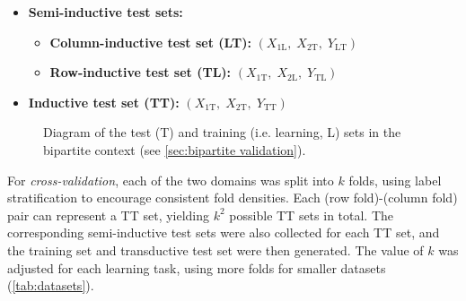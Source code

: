 \documentclass[letterpaper]{article}
\begin{document}
\begin{itemize}
    $(X_\text{1L},\;X_\text{2L}, \;Y_{\text{TD}})$
    \item \textbf{Semi-inductive test sets:}
    \begin{itemize}
        \item \textbf{Column-inductive test set (LT):}
            $
                (X_\text{1L},
                \;X_\text{2T},
                \;Y_\text{LT})
            $
        \item \textbf{Row-inductive test set (TL):}
            $
                (X_\text{1T},
                \;X_\text{2L},
                \;Y_\text{TL})
            $
    \end{itemize}
    \item \textbf{Inductive test set (TT):}
    $(
        X_\text{1T},
        \;X_\text{2T},
        \;Y_\text{TT}
    )$
\end{itemize}

\begin{figure}[tbh]
    \def\svgscale{.3}
    \centering
    
    \caption{Diagram of the test (T) and training (i.e. learning, L) sets in the bipartite context (see \cref{sec:bipartite validation}).}
    \label{fig:train test split}
\end{figure}

For \emph{cross-validation}, each of the two domains was split into $k$ folds, using label stratification to encourage consistent fold densities. Each (row fold)-(column fold) pair can represent a TT set, yielding $k^2$ possible TT sets in total. The corresponding semi-inductive test sets were also collected for each TT set, and the training set and transductive test set were then generated.
The value of $k$ was adjusted for each learning task, using more folds for smaller datasets (\cref{tab:datasets}).
\end{document}

